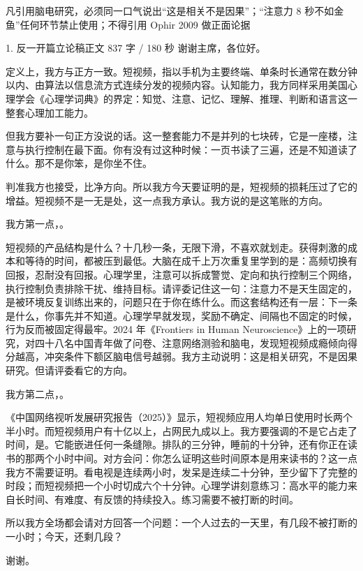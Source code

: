 \documentclass[script,con]{debate}
\begin{document}
\debatetitle
\begin{thesisbox}[全队红线]凡引用脑电研究，必须同一口气说出“这是相关不是因果”；“注意力 8 秒不如金鱼”任何环节禁止使用；不得引用 Ophir 2009 做正面论据\end{thesisbox}
\begin{speech}{1. 反一开篇立论稿}{正文 837 字 / 180 秒}
谢谢主席，各位好。

定义上，我方与正方一致。短视频，指以手机为主要终端、单条时长通常在数分钟以内、由算法以信息流方式连续分发的视频内容。认知能力，我方同样采用美国心理学会《心理学词典》的界定：知觉、注意、记忆、理解、推理、判断和语言这一整套心理加工能力。

但我方要补一句正方没说的话。这一整套能力不是并列的七块砖，它是一座楼，注意与执行控制在最下面。你有没有过这种时候：一页书读了三遍，还是不知道读了什么。那不是你笨，是你坐不住。

判准我方也接受，比净方向。所以我方今天要证明的是，短视频的损耗压过了它的增益。短视频不是一无是处，这一点我方承认。我方说的是这笔账的方向。

我方第一点，。

短视频的产品结构是什么？十几秒一条，无限下滑，不喜欢就划走。获得刺激的成本和等待的时间，都被压到最低。大脑在成千上万次重复里学到的是：高频切换有回报，忍耐没有回报。心理学里，注意可以拆成警觉、定向和执行控制三个网络，执行控制负责排除干扰、维持目标。请评委记住这一句：注意力不是天生固定的，是被环境反复训练出来的，问题只在于你在练什么。而这套结构还有一层：下一条是什么，你事先并不知道。心理学早就发现，奖励不确定、间隔也不固定的时候，行为反而被固定得最牢。2024 年《Frontiers in Human Neuroscience》上的一项研究，对四十八名中国青年做了问卷、注意网络测验和脑电，发现短视频成瘾倾向得分越高，冲突条件下额区脑电信号越弱。我方主动说明：这是相关研究，不是因果研究。但请评委看它的方向。

我方第二点，。

《中国网络视听发展研究报告（2025）》显示，短视频应用人均单日使用时长两个半小时。而短视频用户有十亿以上，占网民九成以上。我方要强调的不是它占走了时间，是。它能嵌进任何一条缝隙。排队的三分钟，睡前的十分钟，还有你正在读书的那两个小时中间。对方会问：你怎么证明这些时间原本是用来读书的？这一点我方不需要证明。看电视是连续两小时，发呆是连续二十分钟，至少留下了完整的时段；而短视频把一个小时切成六个十分钟。心理学讲刻意练习：高水平的能力来自长时间、有难度、有反馈的持续投入。练习需要不被打断的时间。

所以我方全场都会请对方回答一个问题：一个人过去的一天里，有几段不被打断的一小时；今天，还剩几段？

谢谢。

\begin{contingency}
\end{contingency}
\end{speech}
\end{document}
